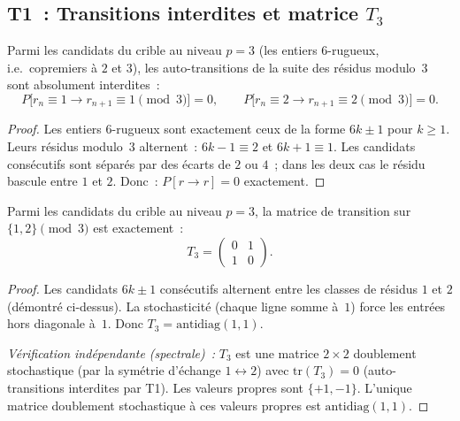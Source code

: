\documentclass[12pt,a4paper]{article}
\begin{document}
\subsection{T1~: Transitions interdites et matrice $T_3$}
\label{app:T1}

\begin{theorembox}
Parmi les candidats du crible au niveau $p = 3$ (les entiers
$6$-rugueux, i.e.\ copremiers \`a $2$ et $3$), les auto-transitions
de la suite des r\'esidus modulo~$3$ sont absolument interdites~:
\begin{equation}
  P\bigl[r_n \equiv 1 \to r_{n+1} \equiv 1 \pmod{3}\bigr] = 0, \qquad
  P\bigl[r_n \equiv 2 \to r_{n+1} \equiv 2 \pmod{3}\bigr] = 0.
  \tag{A.1}
\end{equation}

\begin{proof}
Les entiers $6$-rugueux sont exactement ceux de la forme $6k \pm 1$
pour $k \geq 1$. Leurs r\'esidus modulo~$3$ alternent~:
$6k - 1 \equiv 2$ et $6k + 1 \equiv 1$. Les candidats cons\'ecutifs
sont s\'epar\'es par des \'ecarts de $2$ ou $4$~; dans les deux cas
le r\'esidu bascule entre $1$ et $2$. Donc~:
$P[r \to r] = 0$ exactement.
\end{proof}
\end{theorembox}

\begin{theorembox}
Parmi les candidats du crible au niveau $p = 3$, la matrice de
transition sur $\{1, 2\} \pmod{3}$ est exactement~:
\begin{equation}
  T_3 = \begin{pmatrix} 0 & 1 \\ 1 & 0 \end{pmatrix}.
  \tag{A.2}
\end{equation}

\begin{proof}
Les candidats $6k \pm 1$ cons\'ecutifs alternent entre les classes
de r\'esidus $1$ et $2$ (d\'emontr\'e ci-dessus). La stochasticit\'e
(chaque ligne somme \`a~$1$) force les entr\'ees hors diagonale \`a~$1$.
Donc $T_3 = \mathrm{antidiag}(1,1)$.

\emph{V\'erification ind\'ependante (spectrale)~:}
$T_3$ est une matrice $2 \times 2$ doublement stochastique (par la
sym\'etrie d'\'echange $1 \leftrightarrow 2$) avec
$\mathrm{tr}(T_3) = 0$ (auto-transitions interdites par T1). Les
valeurs propres sont $\{+1, -1\}$. L'unique matrice doublement
stochastique \`a ces valeurs propres est $\mathrm{antidiag}(1,1)$.
\end{proof}
\end{theorembox}
\end{document}
